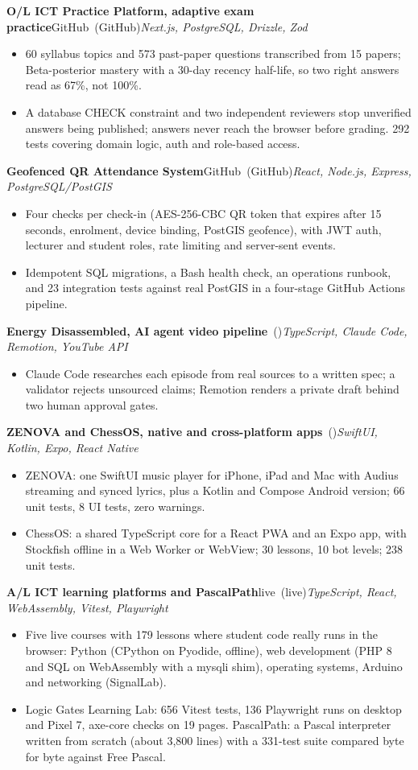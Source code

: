\documentclass[10pt,a4paper]{article}
\newcommand{\project}[3]{%
  \textbf{#1}\ifx\relax#3\relax\else\ (#3)\fi\hfill{\itshape #2}\par
}
\begin{document}
\project{O/L ICT Practice Platform, adaptive exam practice}{Next.js, PostgreSQL, Drizzle, Zod}{GitHub}
\begin{itemize}
  \item 60 syllabus topics and 573 past-paper questions transcribed from 15 papers; Beta-posterior mastery with a 30-day recency half-life, so two right answers read as 67\%, not 100\%.
  \item A database CHECK constraint and two independent reviewers stop unverified answers being published; answers never reach the browser before grading. 292 tests covering domain logic, auth and role-based access.
\end{itemize}
\project{Geofenced QR Attendance System}{React, Node.js, Express, PostgreSQL/PostGIS}{GitHub}
\begin{itemize}
  \item Four checks per check-in (AES-256-CBC QR token that expires after 15 seconds, enrolment, device binding, PostGIS geofence), with JWT auth, lecturer and student roles, rate limiting and server-sent events.
  \item Idempotent SQL migrations, a Bash health check, an operations runbook, and 23 integration tests against real PostGIS in a four-stage GitHub Actions pipeline.
\end{itemize}
\project{Energy Disassembled, AI agent video pipeline}{TypeScript, Claude Code, Remotion, YouTube API}{}
\begin{itemize}
  \item Claude Code researches each episode from real sources to a written spec; a validator rejects unsourced claims; Remotion renders a private draft behind two human approval gates.
\end{itemize}
\project{ZENOVA and ChessOS, native and cross-platform apps}{SwiftUI, Kotlin, Expo, React Native}{}
\begin{itemize}
  \item ZENOVA: one SwiftUI music player for iPhone, iPad and Mac with Audius streaming and synced lyrics, plus a Kotlin and Compose Android version; 66 unit tests, 8 UI tests, zero warnings.
  \item ChessOS: a shared TypeScript core for a React PWA and an Expo app, with Stockfish offline in a Web Worker or WebView; 30 lessons, 10 bot levels; 238 unit tests.
\end{itemize}
\project{A/L ICT learning platforms and PascalPath}{TypeScript, React, WebAssembly, Vitest, Playwright}{live}
\begin{itemize}
  \item Five live courses with 179 lessons where student code really runs in the browser: Python (CPython on Pyodide, offline), web development (PHP 8 and SQL on WebAssembly with a mysqli shim), operating systems, Arduino and networking (SignalLab).
  \item Logic Gates Learning Lab: 656 Vitest tests, 136 Playwright runs on desktop and Pixel 7, axe-core checks on 19 pages. PascalPath: a Pascal interpreter written from scratch (about 3,800 lines) with a 331-test suite compared byte for byte against Free Pascal.
\end{itemize}
\end{document}
